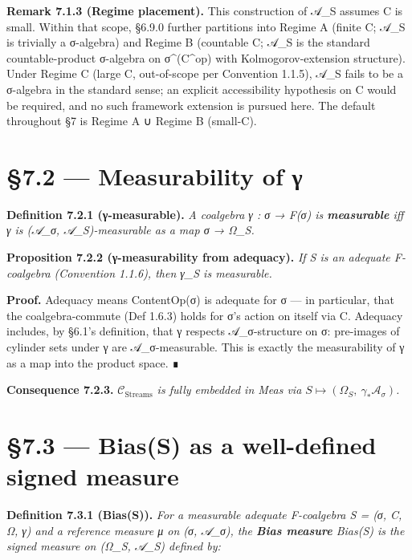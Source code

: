 \documentclass[11pt, openany]{book}
\newcommand{\sectionbreak}{\clearpage}
\begin{document}
\textbf{Remark 7.1.3 (Regime placement).} This construction of 𝒜\_\allowbreak{}S assumes C is small. Within that scope, §6.9.0 further partitions into Regime A (finite C; 𝒜\_\allowbreak{}S is trivially a σ-algebra) and Regime B (countable C; 𝒜\_\allowbreak{}S is the standard countable-product σ-algebra on σ\textasciicircum{}(C\textasciicircum{}op) with Kolmogorov-extension structure). Under Regime C (large C, out-of-scope per Convention 1.1.5), 𝒜\_\allowbreak{}S fails to be a σ-algebra in the standard sense; an explicit accessibility hypothesis on C would be required, and no such framework extension is pursued here. The default throughout §7 is Regime A ∪ Regime B (small-C).

\sectionbreak

\section{§7.2 --- Measurability of γ}

\textbf{Definition 7.2.1 (γ-measurable).} \textit{A coalgebra γ : σ → F(σ) is \textbf{measurable} iff γ is (𝒜\_\allowbreak{}σ, 𝒜\_\allowbreak{}S)-measurable as a map σ → Ω\_\allowbreak{}S.}

\textbf{Proposition 7.2.2 (γ-measurability from adequacy).} \textit{If S is an adequate F-coalgebra (Convention 1.1.6), then γ\_\allowbreak{}S is measurable.}

\textbf{Proof.} Adequacy means ContentOp(σ) is adequate for σ --- in particular, that the coalgebra-commute (Def 1.6.3) holds for σ's action on itself via C. Adequacy includes, by §6.1's definition, that γ respects 𝒜\_\allowbreak{}σ-structure on σ: pre-images of cylinder sets under γ are 𝒜\_\allowbreak{}σ-measurable. This is exactly the measurability of γ as a map into the product space. ∎

\textbf{Consequence 7.2.3.} \textit{$\mathcal{C}_{\mathrm{Streams}}$ is fully embedded in Meas via $S \mapsto (\Omega_S,\ \gamma_* \mathcal{A}_\sigma)$.}

\sectionbreak

\section{§7.3 --- Bias(S) as a well-defined signed measure}

\textbf{Definition 7.3.1 (Bias(S)).} \textit{For a measurable adequate F-coalgebra S = (σ, C, Ω, γ) and a reference measure μ on (σ, 𝒜\_\allowbreak{}σ), the \textbf{Bias measure} Bias(S) is the signed measure on (Ω\_\allowbreak{}S, 𝒜\_\allowbreak{}S) defined by:}
\end{document}
